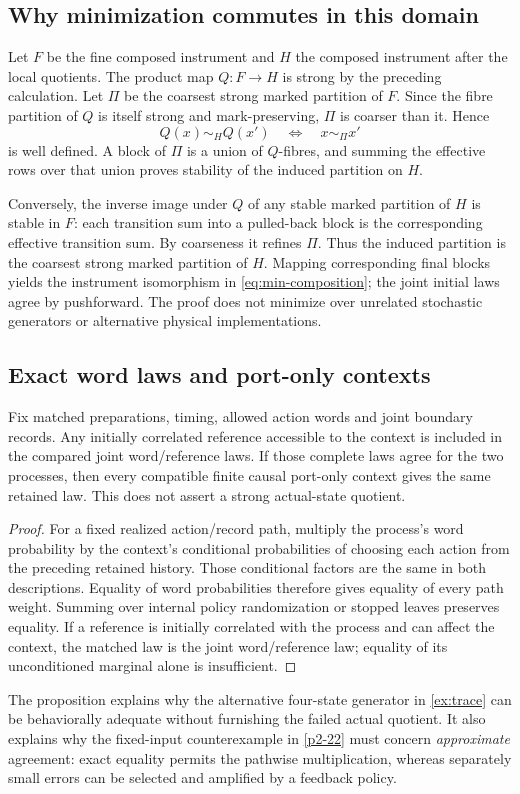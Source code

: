 \subsection{Why minimization commutes in this domain}
Let \(F\) be the fine composed instrument and \(H\) the composed instrument after the local quotients. The product map \(Q:F\to H\) is strong by the preceding calculation. Let \(\Pi\) be the coarsest strong marked partition of \(F\). Since the fibre partition of \(Q\) is itself strong and mark-preserving, \(\Pi\) is coarser than it. Hence
\[
 Q(x)\sim_H Q(x')\quad\Longleftrightarrow\quad x\sim_\Pi x'
\]
is well defined. A block of \(\Pi\) is a union of \(Q\)-fibres, and summing the effective rows over that union proves stability of the induced partition on \(H\).

Conversely, the inverse image under \(Q\) of any stable marked partition of \(H\) is stable in \(F\): each transition sum into a pulled-back block is the corresponding effective transition sum. By coarseness it refines \(\Pi\). Thus the induced partition is the coarsest strong marked partition of \(H\). Mapping corresponding final blocks yields the instrument isomorphism in \cref{eq:min-composition}; the joint initial laws agree by pushforward. The proof does not minimize over unrelated stochastic generators or alternative physical implementations.

\subsection{Exact word laws and port-only contexts}
\begin{proposition}\label{p2-36}
Fix matched preparations, timing, allowed action words and joint boundary records. Any initially correlated reference accessible to the context is included in the compared joint word/reference laws. If those complete laws agree for the two processes, then every compatible finite causal port-only context gives the same retained law. This does not assert a strong actual-state quotient.
\end{proposition}
\begin{proof}
For a fixed realized action/record path, multiply the process's word probability by the context's conditional probabilities of choosing each action from the preceding retained history. Those conditional factors are the same in both descriptions. Equality of word probabilities therefore gives equality of every path weight. Summing over internal policy randomization or stopped leaves preserves equality. If a reference is initially correlated with the process and can affect the context, the matched law is the joint word/reference law; equality of its unconditioned marginal alone is insufficient.
\end{proof}
The proposition explains why the alternative four-state generator in \cref{ex:trace} can be behaviorally adequate without furnishing the failed actual quotient. It also explains why the fixed-input counterexample in \cref{p2-22} must concern \emph{approximate} agreement: exact equality permits the pathwise multiplication, whereas separately small errors can be selected and amplified by a feedback policy.

